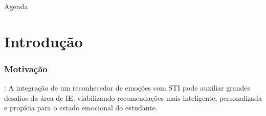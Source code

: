 \documentclass{beamer}
\date{Recife, 31 de Outubro de 2017}
\begin{document}
\begin{frame}
 \maketitle
\end{frame}

\begin{frame}{Agenda}
  \tableofcontents
\end{frame}

\section{Introdu\c{c}\~ao}


\begin{frame}
\frametitle{Motiva\c{c}\~ao}
\pause

\cite{jaques2012}: A integra\c{c}\~ao de um reconhecedor de emo\c{c}\~oes com STI pode auxiliar grandes desafios da \'area de IE, 
viabilizando recomenda\c{c}\~oes mais inteligente, personalizada e prop\'icia para o estado emocional do estudante.

\end{frame}
\end{document}
